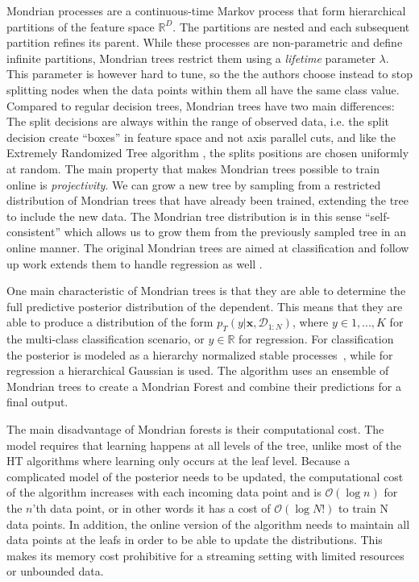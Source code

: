Mondrian processes are a continuous-time
Markov process that form hierarchical partitions of the feature space $\mathbb{R}^D$.
The partitions are nested and each subsequent partition refines its parent. While
these processes are non-parametric and define infinite partitions, Mondrian trees
restrict them using a \emph{lifetime} parameter $\lambda$.
This parameter is however hard to tune,
so the the authors choose instead to stop splitting nodes when the data points
within them all have the same class value. Compared to regular decision trees,
Mondrian trees have two main differences: The split decisions are always within
the range of observed data, i.e. the split decision create ``boxes'' in feature
space and not axis parallel cuts, and like the Extremely Randomized Tree algorithm
\cite{ert}, the splits positions are chosen uniformly at random. The main property that makes Mondrian trees possible to train
online is \emph{projectivity}. We can grow a new tree by sampling from a restricted
distribution of Mondrian trees that have already been trained, extending the tree
to include the new data. The Mondrian tree distribution is in this sense ``self-consistent''
\cite{mondrian-forests-original} which allows us to grow them from the previously
sampled tree in an online manner. The original Mondrian trees are aimed at classification
and follow up work extends them to handle regression as well \cite{mondrian-forests-regression}.

One main characteristic of Mondrian trees is that they are able to determine the full
predictive posterior distribution of the dependent. This means that they are able to
produce a distribution of the form $p_T(y |\mathbf{x}, \mathcal{D}_{1:N})$, where
$y \in {1,..., K}$ for the multi-class classification scenario, or $y \in \mathbb{R}$
for regression. For classification the posterior is modeled as a hierarchy
normalized stable processes~\cite{nsp}, while for regression a hierarchical Gaussian is used.
The algorithm uses an ensemble of Mondrian trees to create a Mondrian Forest and combine
their predictions for a final output.

The main disadvantage of Mondrian forests is their computational cost. The model
requires that learning happens at all levels of the tree, unlike most of the HT
algorithms where learning only occurs at the leaf level. Because a complicated
model of the posterior needs to be updated, the computational cost of the algorithm
increases with each incoming data point and is $\mathcal{O}(\log n)$ for the $n$'th
data point, or in other words it has a cost of $\mathcal{O}(\log N!)$ to train N
data points. In addition, the online version of the algorithm needs to maintain
all data points at the leafs in order to be able to update the distributions.
This makes its memory cost prohibitive for a streaming setting with limited resources
or unbounded data.

